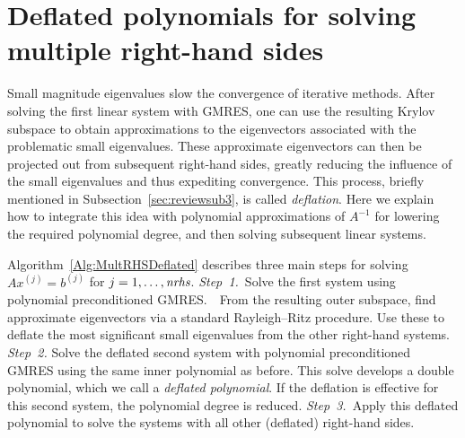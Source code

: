 \documentclass{siamart}
\def\nrhs{\mbox{{\it nrhs}}}
\begin{document}
\section{Deflated polynomials for solving multiple right-hand sides} \label{sec:deflated}

Small magnitude eigenvalues slow the convergence of iterative methods.  After solving the first linear system with GMRES, one can use the resulting Krylov subspace to obtain approximations to the eigenvectors associated with the problematic small eigenvalues.  These approximate eigenvectors can then be projected out from subsequent right-hand sides, greatly reducing the influence of the small eigenvalues and thus expediting convergence.  
This process, briefly mentioned in Subsection~\ref{sec:reviewsub3}, is called \emph{deflation}.
Here we explain how to integrate this idea with polynomial approximations of $A^{-1}$ for lowering the required polynomial degree, and then solving subsequent linear systems.

Algorithm~\ref{Alg:MultRHSDeflated} describes three main steps for solving $Ax^{(j)} = b^{(j)}$ for $j=1,\ldots, \nrhs$.  
\emph{Step~1.}~Solve the first system using polynomial preconditioned GMRES.\ \ From the resulting outer subspace, find approximate eigenvectors via a standard Rayleigh--Ritz procedure.  Use these  to deflate the most significant small eigenvalues from the other right-hand systems.  \emph{Step~2.} Solve the deflated second system with polynomial preconditioned GMRES using the same inner polynomial as before.  This solve develops a double polynomial, which we call a \emph{deflated polynomial}.  If the deflation is effective for this second system, the polynomial degree is reduced. \emph{Step~3.}~Apply this deflated polynomial to solve the systems with all other (deflated) right-hand sides.  
\end{document}
